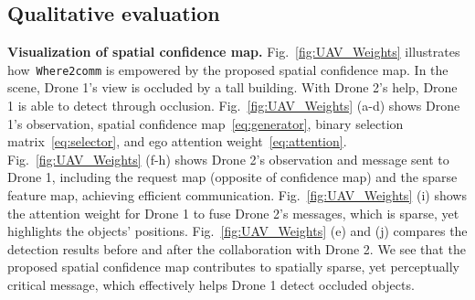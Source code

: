 \vspace{-2mm}
\subsection{Qualitative evaluation}
\vspace{-2mm}

\textbf{Visualization of spatial confidence map.} Fig.~\ref{fig:UAV_Weights} illustrates how~\texttt{Where2comm} is empowered by the proposed spatial confidence map. In the scene, Drone 1's view is occluded by a tall building. With Drone 2's help, Drone 1 is able to detect through occlusion. Fig.~\ref{fig:UAV_Weights} (a-d) shows Drone 1's observation, spatial confidence map~\eqref{eq:generator}, binary selection matrix~\eqref{eq:selector}, and ego attention weight~\eqref{eq:attention}. Fig.~\ref{fig:UAV_Weights} (f-h) shows Drone 2's observation and message sent to Drone 1, including the request map (opposite of confidence map) and the sparse feature map, achieving efficient communication. Fig.~\ref{fig:UAV_Weights} (i) shows the attention weight for Drone 1 to fuse Drone 2's messages, which is sparse, yet highlights the objects' positions. Fig.~\ref{fig:UAV_Weights} (e) and (j) compares the detection results before and after the collaboration with Drone 2. We see that the proposed spatial confidence map contributes to spatially sparse, yet perceptually critical message, which effectively helps Drone 1 detect occluded objects.




